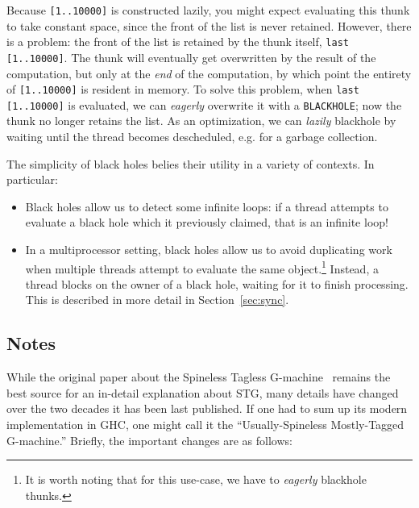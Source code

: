 Because \verb|[1..10000]| is constructed lazily, you might expect
evaluating this thunk to take constant space, since the front of the
list is never retained.  However, there is a problem: the front of the
list is retained by the thunk itself, \verb|last [1..10000]|.  The thunk
will eventually get overwritten by the result of the computation, but
only at the \emph{end} of the computation, by which point the entirety
of \verb|[1..10000]| is resident in memory.  To solve this problem, when
\verb|last [1..10000]| is evaluated, we can \emph{eagerly} overwrite it
with a \verb|BLACKHOLE|; now the thunk no longer retains the list.  As
an optimization, we can \emph{lazily} blackhole by waiting until the
thread becomes descheduled, e.g. for a garbage collection.

The simplicity of black holes belies their utility in a variety of contexts.
In particular:

\begin{itemize}
\item Black holes allow us to detect some infinite loops: if a thread attempts
    to evaluate a black hole which it previously claimed, that is an infinite loop!
\item In a multiprocessor setting, black holes allow us to avoid duplicating work when multiple
    threads attempt to evaluate the same object.\footnote{It is worth noting that for this use-case, we have to \emph{eagerly} blackhole thunks.}  Instead, a thread blocks on the owner
    of a black hole, waiting for it to finish processing.  This is described in more
    detail in Section~\ref{sec:sync}.
\end{itemize}

\subsection{Notes}


While the original paper about the Spineless Tagless
G-machine~\cite{PeytonJones1992} remains the best source for an
in-detail explanation about STG, many details have changed over the two
decades it has been last published.  If one had to sum up its modern
implementation in GHC, one might call it the ``Usually-Spineless
Mostly-Tagged G-machine.''  Briefly, the important changes are as
follows:

